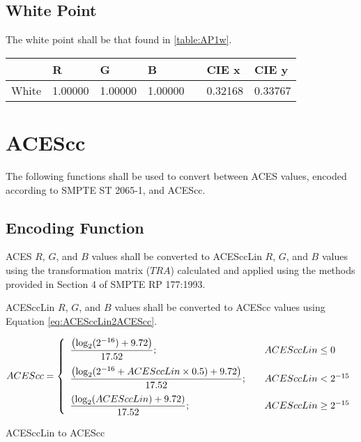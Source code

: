 \subsection{White Point}
The white point shall be that found in \autoref{table:AP1w}.

\begin{center}
\begin{tabularx}{4.5in}{XlllXll}
        & R       & G       & B       & & CIE x & CIE y \\ \hline
White   & 1.00000 & 1.00000 & 1.00000 & & 0.32168 & 0.33767 \\
\end{tabularx}
\label{table:AP1w}
\end{center}

\newpage
\section{ACEScc}
\label{sec:ACEScc}
The following functions shall be used to convert between ACES values, encoded according to SMPTE ST 2065-1, and ACEScc.

\subsection{Encoding Function}
ACES $R$, $G$, and $B$ values shall be converted to ACESccLin $R$, $G$, and $B$ values using the transformation matrix ($TRA$) calculated and applied using the methods provided in Section 4 of SMPTE RP 177:1993.

ACESccLin $R$, $G$, and $B$ values shall be converted to ACEScc values using Equation \ref{eq:ACESccLin2ACEScc}.

\begin{floatequ} 
\begin{equation} 
    ACEScc = \left\{ 
    \begin{array}{l l }
        \dfrac{\left(\log_{2}(2^{-16}) + 9.72\right)}{17.52};    & \quad ACESccLin \leq 0 \\[10pt]
        \dfrac{\left(\log_{2}(2^{-16} + ACESccLin \times 0.5) + 9.72\right)}{17.52};        & \quad ACESccLin < 2^{-15} \\[10pt]
        \dfrac{\left(\log_{2}(ACESccLin) + 9.72\right)}{17.52}; & \quad ACESccLin \geq 2^{-15} \\    
    \end{array} \right.
\end{equation}
\caption{ACESccLin to ACEScc}
\label{eq:ACESccLin2ACEScc}
\end{floatequ}

